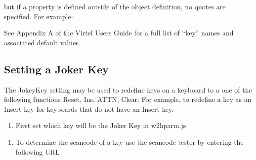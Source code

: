 \documentclass[letterpaper,10pt,english]{sphinxmanual}
\begin{document}
\sphinxAtStartPar
but if a property is defined outside of the object definition, no quotes are specified. For example:

\begin{sphinxVerbatim}[commandchars=\\\{\}]
  
\end{sphinxVerbatim}

\sphinxAtStartPar
See Appendix A of the Virtel Users Guide for a full list of “key” names and associated default values.

\ignorespaces 

\subsection{Setting a Joker Key}
\label{\detokenize{Customization:setting-a-joker-key}}\label{\detokenize{Customization:index-1}}
\sphinxAtStartPar
The JokeyKey setting may be used to redefine keys on a keyboard to a one of the following functions \sphinxhyphen{} Reset, Ins, ATTN, Clear. For example, to redefine a key as an Insert key for keyboards that do not have an Insert key.
\begin{enumerate}
%
\item {} 
\sphinxAtStartPar
First set which key will be the Joker Key in w2hparm.js

\end{enumerate}

\begin{sphinxVerbatim}[commandchars=\\\{\}]
           
\end{sphinxVerbatim}
\begin{enumerate}
%
\setcounter{enumi}{1}
\item {} 
\sphinxAtStartPar
To determine the scancode of a key use the scancode tester by entering the following URL

\end{enumerate}
\end{document}
